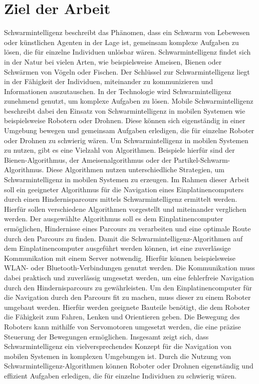 \section{Ziel der Arbeit}
Schwarmintelligenz beschreibt das Phänomen, dass ein Schwarm von Lebewesen oder künstlichen Agenten in der Lage ist, gemeinsam komplexe Aufgaben zu lösen, die für einzelne Individuen unlösbar wären. Schwarmintelligenz findet sich in der Natur bei vielen Arten, wie beispielsweise Ameisen, Bienen oder Schwärmen von Vögeln oder Fischen. Der Schlüssel zur Schwarmintelligenz liegt in der Fähigkeit der Individuen, miteinander zu kommunizieren und Informationen auszutauschen.
In der Technologie wird Schwarmintelligenz zunehmend genutzt, um komplexe Aufgaben zu lösen. Mobile Schwarmintelligenz beschreibt dabei den Einsatz von Schwarmintelligenz in mobilen Systemen wie beispielsweise Robotern oder Drohnen. Diese können sich eigenständig in einer Umgebung bewegen und gemeinsam Aufgaben erledigen, die für einzelne Roboter oder Drohnen zu schwierig wären.
Um Schwarmintelligenz in mobilen Systemen zu nutzen, gibt es eine Vielzahl von Algorithmen. Beispiele hierfür sind der Bienen-Algorithmus, der Ameisenalgorithmus oder der Partikel-Schwarm-Algorithmus. Diese Algorithmen nutzen unterschiedliche Strategien, um Schwarmintelligenz in mobilen Systemen zu erzeugen.
Im Rahmen dieser Arbeit soll ein geeigneter Algorithmus für die Navigation eines Einplatinencomputers durch einen Hindernisparcours mittels Schwarmintelligenz ermittelt werden. Hierfür sollen verschiedene Algorithmen vorgestellt und miteinander verglichen werden. Der ausgewählte Algorithmus soll es dem Einplatinencomputer ermöglichen, Hindernisse eines Parcours zu verarbeiten und eine optimale Route durch den Parcours zu finden.
Damit die Schwarmintelligenz-Algorithmen auf dem Einplatinencomputer ausgeführt werden können, ist eine zuverlässige Kommunikation mit einem Server notwendig. Hierfür können beispielsweise WLAN- oder Bluetooth-Verbindungen genutzt werden. Die Kommunikation muss dabei praktisch und zuverlässig umgesetzt werden, um eine fehlerfreie Navigation durch den Hindernisparcours zu gewährleisten.
Um den Einplatinencomputer für die Navigation durch den Parcours fit zu machen, muss dieser zu einem Roboter umgebaut werden. Hierfür werden geeignete Bauteile benötigt, die dem Roboter die Fähigkeit zum Fahren, Lenken und Orientieren geben. Die Bewegung des Roboters kann mithilfe von Servomotoren umgesetzt werden, die eine präzise Steuerung der Bewegungen ermöglichen.
Insgesamt zeigt sich, dass Schwarmintelligenz ein vielversprechendes Konzept für die Navigation von mobilen Systemen in komplexen Umgebungen ist. Durch die Nutzung von Schwarmintelligenz-Algorithmen können Roboter oder Drohnen eigenständig und effizient Aufgaben erledigen, die für einzelne Individuen zu schwierig wären.

